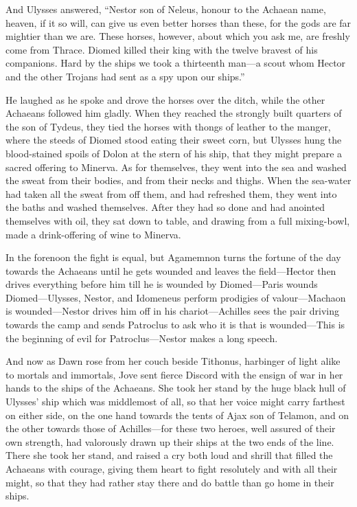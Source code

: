 And Ulysses answered, “Nestor son of Neleus, honour to the Achaean name,
heaven, if it so will, can give us even better horses than these, for the
gods are far mightier than we are. These horses, however, about which you
ask me, are freshly come from Thrace. Diomed killed their king with the
twelve bravest of his companions. Hard by the ships we took a thirteenth
man—a scout whom Hector and the other Trojans had sent as a spy upon
our ships.”

He laughed as he spoke and drove the horses over the ditch, while the
other Achaeans followed him gladly. When they reached the strongly built
quarters of the son of Tydeus, they tied the horses with thongs of leather
to the manger, where the steeds of Diomed stood eating their sweet corn,
but Ulysses hung the blood-stained spoils of Dolon at the stern of his
ship, that they might prepare a sacred offering to Minerva. As for
themselves, they went into the sea and washed the sweat from their bodies,
and from their necks and thighs. When the sea-water had taken all the
sweat from off them, and had refreshed them, they went into the baths and
washed themselves. After they had so done and had anointed themselves with
oil, they sat down to table, and drawing from a full mixing-bowl, made a
drink-offering of wine to Minerva.


In the forenoon the fight is equal, but Agamemnon turns the fortune of the
day towards the Achaeans until he gets wounded and leaves the field—Hector
then drives everything before him till he is wounded by Diomed—Paris
wounds Diomed—Ulysses, Nestor, and Idomeneus perform prodigies of
valour—Machaon is wounded—Nestor drives him off in his chariot—Achilles
sees the pair driving towards the camp and sends Patroclus to ask who it
is that is wounded—This is the beginning of evil for Patroclus—Nestor
makes a long speech.

And now as Dawn rose from her couch beside Tithonus, harbinger of light
alike to mortals and immortals, Jove sent fierce Discord with the ensign
of war in her hands to the ships of the Achaeans. She took her stand by
the huge black hull of Ulysses’ ship which was middlemost of all, so that
her voice might carry farthest on either side, on the one hand towards the
tents of Ajax son of Telamon, and on the other towards those of Achilles—for
these two heroes, well assured of their own strength, had valorously drawn
up their ships at the two ends of the line. There she took her stand, and
raised a cry both loud and shrill that filled the Achaeans with courage,
giving them heart to fight resolutely and with all their might, so that
they had rather stay there and do battle than go home in their ships.

